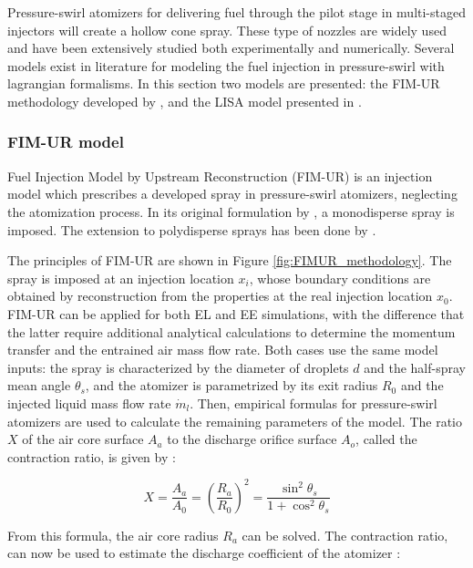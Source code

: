 Pressure-swirl atomizers for delivering fuel through the pilot stage in multi-staged injectors will create a hollow cone spray. These type of nozzles are widely used and have been extensively studied both experimentally and numerically. Several models exist in literature for modeling the fuel injection in pressure-swirl with lagrangian formalisms. In this section two models are presented: the FIM-UR methodology developed by , and the LISA model presented in .


\subsubsection*{FIM-UR model}

Fuel Injection Model by Upstream Reconstruction (FIM-UR) is an injection model which prescribes a developed spray in pressure-swirl atomizers, neglecting the atomization process. In its original formulation by , a monodisperse spray is imposed. The extension to polydisperse sprays has been done by .

The principles of FIM-UR are shown in Figure \ref{fig:FIMUR_methodology}. The spray is imposed at an injection location $x_i$, whose boundary conditions are obtained by reconstruction from the properties at the real injection location $x_0$. FIM-UR can be applied for both EL and EE simulations, with the difference that the latter require additional analytical calculations to determine the momentum transfer and the entrained air mass flow rate. Both cases use the same model inputs: the spray is characterized by the diameter of droplets $d$ and the half-spray mean angle $\theta_s$, and the atomizer is parametrized by its exit radius $R_0$ and the injected liquid mass flow rate $\dot{m}_l$. Then, empirical formulas for pressure-swirl atomizers are used to calculate the remaining parameters of the model. The ratio $X$ of the air core surface $A_a$ to the discharge orifice surface $A_o$, called the contraction ratio, is given by :

\begin{equation}
X = \frac{A_a}{A_0} = \left( \frac{R_a}{R_0} \right)^2 = \frac{\sin^2 \theta_s}{1 + \cos^2 \theta_s}
\end{equation}

From this formula, the air core radius $R_a$ can be solved. The contraction ratio, can now be used to estimate the discharge coefficient of the atomizer :

